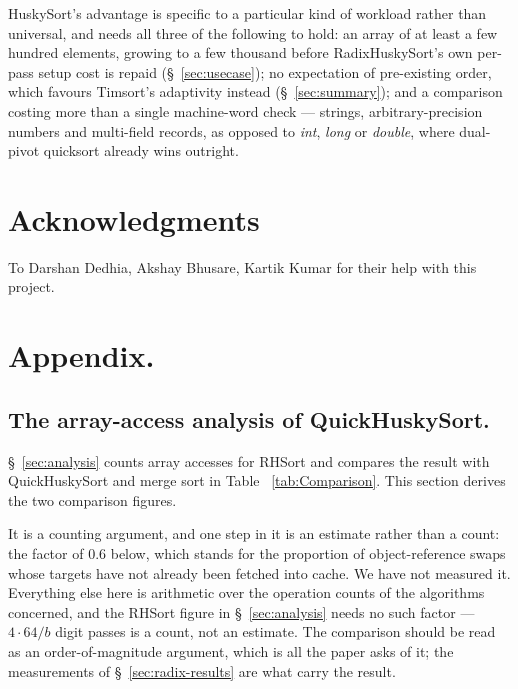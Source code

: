 \documentclass[twoside,leqno,twocolumn]{article}
\newif\ifanonymous
\begin{document}
HuskySort's advantage is specific to a particular kind of workload rather than universal, and needs
all three of the following to hold: an array of at least a few hundred elements, growing to a few
thousand before RadixHuskySort's own per-pass setup cost is repaid (\S~\ref{sec:usecase});
no expectation of pre-existing order, which favours Timsort's adaptivity instead (\S~\ref{sec:summary});
and a comparison costing more than a single machine-word check --- strings, arbitrary-precision numbers
and multi-field records, as opposed to \textit{int}, \textit{long} or \textit{double},
where dual-pivot quicksort already wins outright.

\ifanonymous\else
  \section*{Acknowledgments}
  To Darshan Dedhia, Akshay Bhusare, Kartik Kumar for their help with this project.
\fi






\appendix
\section{Appendix.}
\subsection{The array-access analysis of QuickHuskySort.}
\label{sec:qhs-analysis}

\S~\ref{sec:analysis} counts array accesses for RHSort and compares the result with QuickHuskySort and
merge sort in Table ~\ref{tab:Comparison}. This section derives the two comparison figures.

It is a counting argument, and one step in it is an estimate rather than a count: the factor of 0.6
below, which stands for the proportion of object-reference swaps whose targets have not already been
fetched into cache. We have not measured it. Everything else here is arithmetic over the operation
counts of the algorithms concerned, and the RHSort figure in \S~\ref{sec:analysis} needs no such
factor --- $4 \cdot 64/b$ digit passes is a count, not an estimate. The comparison should be read as an
order-of-magnitude argument, which is all the paper asks of it; the measurements of
\S~\ref{sec:radix-results} are what carry the result.
\end{document}
